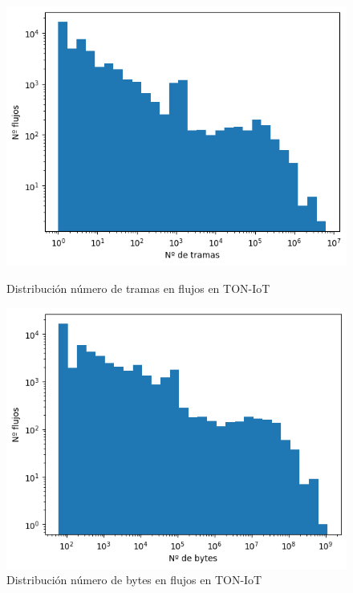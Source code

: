 \begin{figure}[H]
    \includegraphics[width=\linewidth]{media/toniot_pcap_frames_distribution.png}
    \captionsetup{justification=centering}
    \caption{Distribución número de tramas en flujos en TON-IoT}\label{fig:toniot_pcap_frames_distribution}
  \endminipage\hfill
    \includegraphics[width=\linewidth]{media/toniot_pcap_bytes_distribution.png}
    \captionsetup{justification=centering}
    \caption{Distribución número de bytes en flujos en TON-IoT}\label{fig:toniot_pcap_bytes_distribution}
  \endminipage\hfill
\end{figure}

